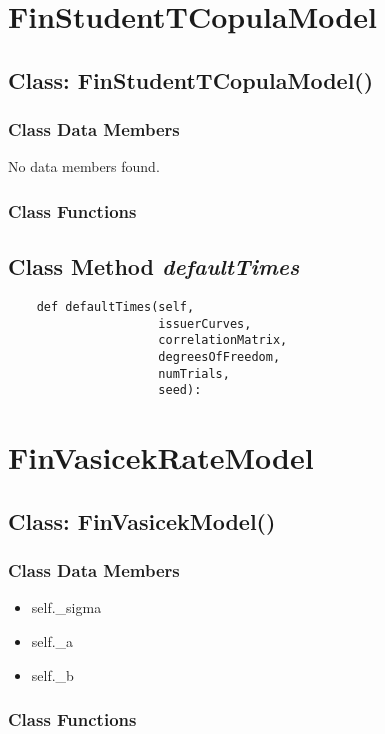 \documentclass[twoside,11pt]{book}
\begin{document}
\newpage
\section{FinStudentTCopulaModel}

\subsection{Class: FinStudentTCopulaModel()}


\subsubsection{Class Data Members}
No data members found.

\subsubsection{Class Functions}

\subsection{Class Method {\it defaultTimes}}


\begin{lstlisting}
    def defaultTimes(self, 
                     issuerCurves, 
                     correlationMatrix, 
                     degreesOfFreedom,
                     numTrials, 
                     seed):
\end{lstlisting}

\newpage
\section{FinVasicekRateModel}

\subsection{Class: FinVasicekModel()}


\subsubsection{Class Data Members}
\begin{itemize}
\item{self.\_sigma}
\item{self.\_a}
\item{self.\_b}
\end{itemize}

\subsubsection{Class Functions}
\end{document}
